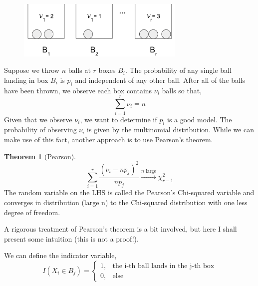 \documentclass[12pt]{article}
\numberwithin{equation}{section}
\theoremstyle{definition}
\newtheorem{theorem}{Theorem}[section]
\begin{document}
\begin{figure}[H]
	\centering
	\includegraphics[width=8cm] {boxes}
\end{figure}

Suppose we throw $ n $ balls at $ r $ boxes $ B_i $. The probability of any single ball landing in box $B_i $ is $ p_i $ and independent of any other ball. After all of the balls have been thrown, we observe each box contains $ \nu_i $ balls so that,
\begin{equation}
		\sum_{i=1}^r \nu_i = n
\end{equation}
Given that we observe $ \nu_i $, we want to determine if $ p_i $ is a good model.  The probability of observing $\nu_i$ is given by the multinomial distribution. While we can make use of this fact, another approach is to use Pearson's theorem.

\begin{theorem}[Pearson]
	\begin{equation}
			\sum_{i=1}^r \frac{(\nu_i-np_j)^2}{np_j} \xrightarrow{n\text{ large}} \chi^2_{r-1}
	\end{equation}
	The random variable on the LHS is called the Pearson's Chi-squared variable and converges in distribution (large n) to the Chi-squared distribution with one less degree of freedom.
\end{theorem}

A rigorous treatment of Pearson's theorem is a bit involved, but here I shall present some intuition (this is not a proof!). 

We can define the indicator variable,
\begin{equation}
		 I(X_i\in B_j) = 
		 \begin{cases}
		 	1, & \text{the i-th ball lands in the j-th box}\\
		 	0, & \text{else}
		 \end{cases}
\end{equation} 
\end{document}
